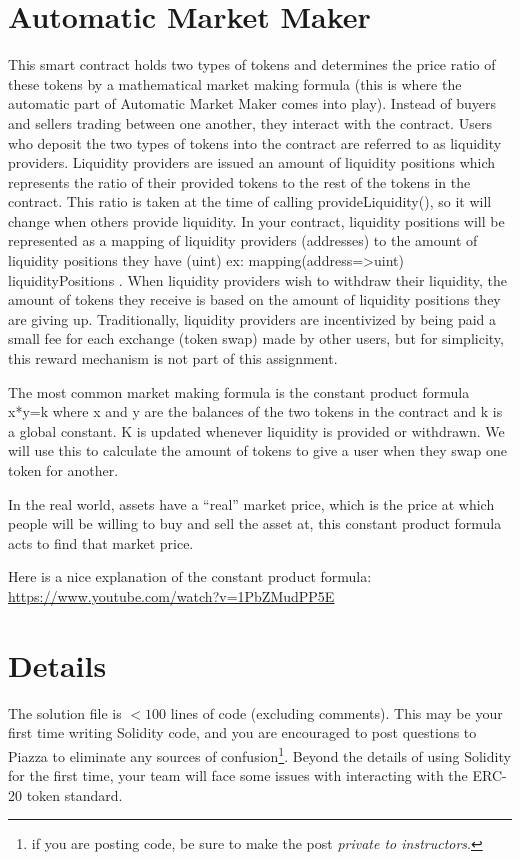 \documentclass[10pt]{article}
\begin{document}
\section {Automatic Market Maker}
This smart contract holds two types of tokens and determines the price ratio of these tokens by a mathematical market making formula (this is where the automatic part of Automatic Market Maker comes into play).  Instead of buyers and sellers trading between one another, they interact with the contract.  Users who deposit the two types of tokens into the contract are referred to as liquidity providers.  Liquidity providers are issued an amount of liquidity positions which represents the ratio of their provided tokens to the rest of the tokens in the contract.  This ratio is taken at the time of calling provideLiquidity(), so it will change when others provide liquidity.  In your contract, liquidity positions will be represented as a mapping of liquidity providers (addresses) to the amount of liquidity positions they have (uint) ex: mapping(address=>uint) liquidityPositions .  When liquidity providers wish to withdraw their liquidity,  the amount of tokens they receive is based on the amount of liquidity positions they are giving up.  Traditionally, liquidity providers are incentivized by being paid a small fee for each exchange (token swap) made by other users, but for simplicity, this reward mechanism is not part of this assignment.

The most common market making formula is the constant product formula x*y=k where x and y are the balances of the two tokens in the contract and k is a global constant.  K is updated whenever liquidity is provided or withdrawn.  We will use this to calculate the amount of tokens to give a user when they swap one token for another.

In the real world, assets have a “real” market price, which is the price at which people will be willing to buy and sell the asset at, this constant product formula acts to find that market price.

Here is a nice explanation of the constant product formula: \url{https://www.youtube.com/watch?v=1PbZMudPP5E}

\section {Details}
The solution file is $<100$ lines of code (excluding comments).  This may be your first time writing Solidity code, and you are encouraged to post questions to Piazza to eliminate any sources of confusion\footnote{if you are posting code,
be sure to make the post {\it private to instructors}.}.  Beyond the details of using Solidity for the first time, your team will face some issues with interacting with the ERC-20 token standard.
\end{document}
